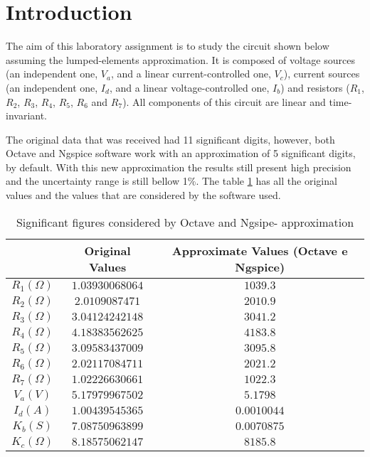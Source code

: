 \section{Introduction}
\label{sec:introduction}

\par
The aim of this laboratory assignment is to study the circuit shown below assuming the lumped-elements approximation. It is composed of voltage sources (an independent one, $V_a$, and a linear current-controlled one, $V_c$), current sources (an independent one, $I_d$, and a linear voltage-controlled one, $I_b$) and resistors ($R_1$, $R_2$, $R_3$, $R_4$, $R_5$, $R_6$ and $R_7$). All components of this circuit are linear and time-invariant.

The original data that was received had 11 significant digits, however, both Octave and Ngspice software work with an approximation of 5 significant digits, by default. With this new approximation the results still present high precision and the uncertainty range is still bellow 1\%. The table \ref{tab:ap} has all the original values and the values that are considered by the software used. 


\begin{table}[hbt!]
\centering
\begin{tabular}{|c|c|c|}
\hline
        &           \textbf{Original Values}        & \textbf{Approximate Values (Octave e Ngspice)}\\ \hline
 $R_1 (\Omega)$   &  $   1.03930068064   $     & $1039.3$\\ \hline
 $R_2 (\Omega)$   &  $   2.0109087471    $      & $2010.9$\\ \hline
 $R_3 (\Omega)$   &  $   3.04124242148   $    & $3041.2$\\ \hline
 $R_4 (\Omega)$   &  $   4.18383562625   $     & $4183.8$\\ \hline
 $R_5 (\Omega)$   &  $   3.09583437009   $     & $3095.8$\\ \hline
 $R_6 (\Omega)$   &  $   2.02117084711   $     & $2021.2$\\ \hline
 $R_7 (\Omega)$   &  $   1.02226630661   $     & $1022.3$\\\hline
 $V_a (V)$   &  $   5.17979967502   $     & $5.1798$\\ \hline
 $I_d (A)$   &  $    1.00439545365     $     & $0.0010044$\\ \hline
 $K_b (S)$   &  $    7.08750963899     $     & $0.0070875$\\ \hline
 $K_c (\Omega)$   &     $8.18575062147    $     & $8185.8$\\ \hline
\end{tabular}
\caption{Significant figures considered by Octave and Ngsipe- approximation} 
\label{tab:ap}
\end{table}

